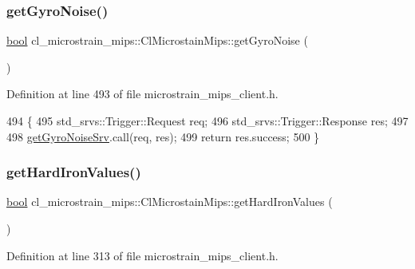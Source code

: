 \subsubsection{\texorpdfstring{get\+Gyro\+Noise()}{getGyroNoise()}}
{\footnotesize\ttfamily \hyperlink{classbool}{bool} cl\+\_\+microstrain\+\_\+mips\+::\+Cl\+Microstain\+Mips\+::get\+Gyro\+Noise (\begin{DoxyParamCaption}{ }\end{DoxyParamCaption})\hspace{0.3cm}{\ttfamily [inline]}}



Definition at line 493 of file microstrain\+\_\+mips\+\_\+client.\+h.


\begin{DoxyCode}
494     \{
495         std\_srvs::Trigger::Request req;
496         std\_srvs::Trigger::Response res;
497 
498         \hyperlink{classcl__microstrain__mips_1_1ClMicrostainMips_a7876569caf3e8169a1972ad8a591c772}{getGyroNoiseSrv}.call(req, res);
499         \textcolor{keywordflow}{return} res.success;
500     \}
\end{DoxyCode}
\mbox{\label{classcl__microstrain__mips_1_1ClMicrostainMips_aa138907ebb7fb634373f948028202749}} 
\subsubsection{\texorpdfstring{get\+Hard\+Iron\+Values()}{getHardIronValues()}}
{\footnotesize\ttfamily \hyperlink{classbool}{bool} cl\+\_\+microstrain\+\_\+mips\+::\+Cl\+Microstain\+Mips\+::get\+Hard\+Iron\+Values (\begin{DoxyParamCaption}{ }\end{DoxyParamCaption})\hspace{0.3cm}{\ttfamily [inline]}}



Definition at line 313 of file microstrain\+\_\+mips\+\_\+client.\+h.


